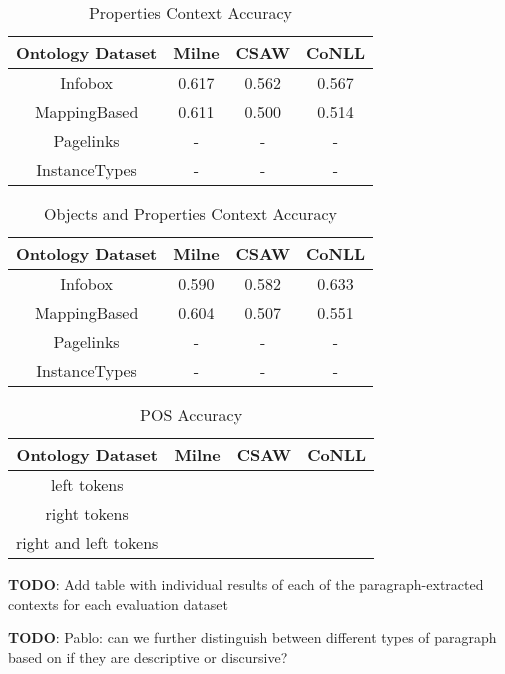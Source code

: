 \documentclass[10pt,a4paper]{article}
\newcommand{\todo}[1]{{\color{red}\textsf{\textbf{TODO}}: #1}}
\begin{document}
\begin{table}[ht] 
\caption{Properties Context Accuracy} 
\centering
\begin{tabular}{c c c c}
\hline\hline 
Ontology Dataset	& Milne 	& CSAW 	& CoNLL \\ [0.5ex] 
\hline 
Infobox 			& 0.617	& 0.562	& 0.567 \\ 
MappingBased 		& 0.611 	& 0.500 	& 0.514 \\ 
Pagelinks 			&  -		&  -		& - \\ 
InstanceTypes 		&  -		&  -		& - \\  [1ex] 
\hline
\end{tabular} 
\label{table:nonlin} 
\end{table} 

\begin{table}[ht] 
\caption{Objects and Properties Context Accuracy} 
\centering
\begin{tabular}{c c c c}
\hline\hline 
Ontology Dataset	& Milne 	& CSAW 	& CoNLL \\ [0.5ex] 
\hline 
Infobox 			& 0.590	& 0.582	& 0.633 \\ 
MappingBased 		& 0.604 	& 0.507 	& 0.551\\ 
Pagelinks 			&  -		&  -		&  -\\ 
InstanceTypes 		&  -		&  -		& - \\ [1ex] 
\hline
\end{tabular} 
\label{table:nonlin} 
\end{table} 

\begin{table}[ht] 
\caption{POS Accuracy}
\centering
\begin{tabular}{c c c c}
\hline\hline 
Ontology Dataset		& Milne 	& CSAW 	& CoNLL \\ [0.5ex] 
\hline 
left tokens 			& 		&	 	&  \\ 
right tokens			&  		&  		&  \\ 
right and left tokens		& 		& 		&  \\  [1ex] 
\hline
\end{tabular} 
\label{table:nonlin} 
\end{table} 



\todo{Add table with individual results of each of the paragraph-extracted contexts for each evaluation dataset}

\todo{Pablo: can we further distinguish between different types of paragraph based on if they are descriptive or discursive?}
\end{document}
